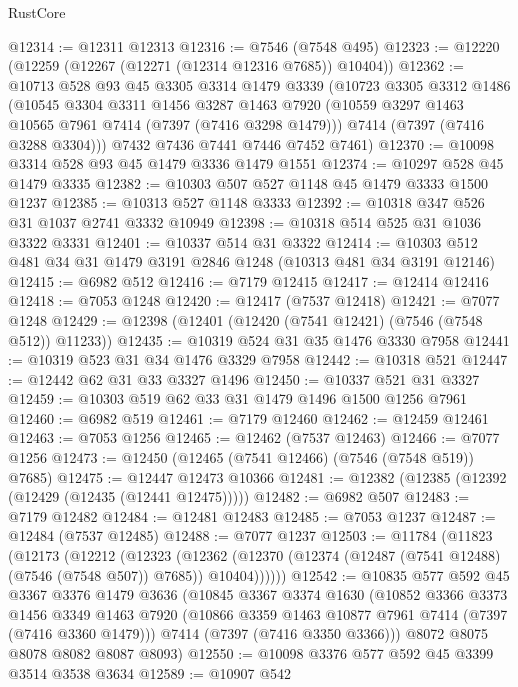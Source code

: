 \begin{lexlean}{RustCore}
\begin{coremodule}
@12314 := @12311 @12313
@12316 := @7546 (@7548 @495)
@12323 := @12220 (@12259 (@12267 (@12271 (@12314 @12316 @7685)) @10404))
@12362 := @10713
    @528
    @93
    @45
    @3305
    @3314
    @1479
    @3339
    (@10723
      @3305
      @3312
      @1486
      (@10545
        @3304
        @3311
        @1456
        @3287
        @1463
        @7920
        (@10559 @3297 @1463 @10565 @7961 @7414 (@7397 (@7416 @3298 @1479)))
        @7414
        (@7397 (@7416 @3288 @3304)))
      @7432
      @7436
      @7441
      @7446
      @7452
      @7461)
@12370 := @10098 @3314 @528 @93 @45 @1479 @3336 @1479 @1551
@12374 := @10297 @528 @45 @1479 @3335
@12382 := @10303 @507 @527 @1148 @45 @1479 @3333 @1500 @1237
@12385 := @10313 @527 @1148 @3333
@12392 := @10318 @347 @526 @31 @1037 @2741 @3332 @10949
@12398 := @10318 @514 @525 @31 @1036 @3322 @3331
@12401 := @10337 @514 @31 @3322
@12414 := @10303 @512 @481 @34 @31 @1479 @3191 @2846 @1248 (@10313 @481 @34 @3191 @12146)
@12415 := @6982 @512
@12416 := @7179 @12415
@12417 := @12414 @12416
@12418 := @7053 @1248
@12420 := @12417 (@7537 @12418)
@12421 := @7077 @1248
@12429 := @12398 (@12401 (@12420 (@7541 @12421) (@7546 (@7548 @512)) @11233))
@12435 := @10319 @524 @31 @35 @1476 @3330 @7958
@12441 := @10319 @523 @31 @34 @1476 @3329 @7958
@12442 := @10318 @521
@12447 := @12442 @62 @31 @33 @3327 @1496
@12450 := @10337 @521 @31 @3327
@12459 := @10303 @519 @62 @33 @31 @1479 @1496 @1500 @1256 @7961
@12460 := @6982 @519
@12461 := @7179 @12460
@12462 := @12459 @12461
@12463 := @7053 @1256
@12465 := @12462 (@7537 @12463)
@12466 := @7077 @1256
@12473 := @12450 (@12465 (@7541 @12466) (@7546 (@7548 @519)) @7685)
@12475 := @12447 @12473 @10366
@12481 := @12382 (@12385 (@12392 (@12429 (@12435 (@12441 @12475)))))
@12482 := @6982 @507
@12483 := @7179 @12482
@12484 := @12481 @12483
@12485 := @7053 @1237
@12487 := @12484 (@7537 @12485)
@12488 := @7077 @1237
@12503 := @11784
    (@11823
      (@12173
        (@12212
          (@12323
            (@12362 (@12370 (@12374 (@12487 (@7541 @12488) (@7546 (@7548 @507)) @7685)) @10404))))))
@12542 := @10835
    @577
    @592
    @45
    @3367
    @3376
    @1479
    @3636
    (@10845
      @3367
      @3374
      @1630
      (@10852
        @3366
        @3373
        @1456
        @3349
        @1463
        @7920
        (@10866 @3359 @1463 @10877 @7961 @7414 (@7397 (@7416 @3360 @1479)))
        @7414
        (@7397 (@7416 @3350 @3366)))
      @8072
      @8075
      @8078
      @8082
      @8087
      @8093)
@12550 := @10098 @3376 @577 @592 @45 @3399 @3514 @3538 @3634
@12589 := @10907
    @542

\end{coremodule}
\end{lexlean}
